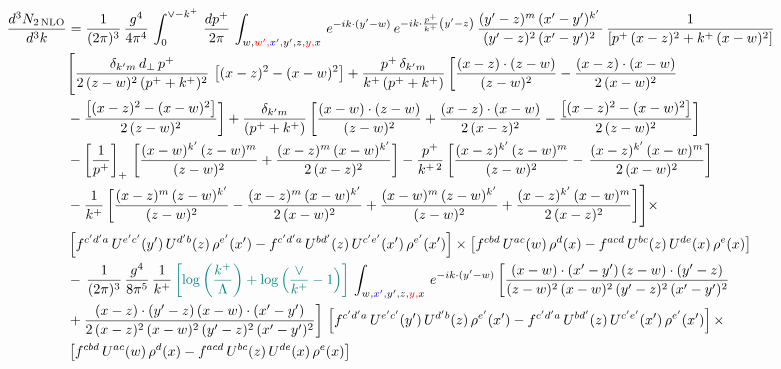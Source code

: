 \documentclass[9pt]{article}
\numberwithin{equation}{section}
\begin{document}
\begin{align}
 \frac{d^{3}N_{2\,\rm NLO}}{d^{3}k} & = \frac{1}{(2\pi)^{3}}\,\frac{g^{4}}{4\pi^{4}}\,\int_{0}^{\vee-k^{+}}\, \frac{dp^{+}}{2\pi}\,\int_{w,{\color{red}w',}{\color{blue}x',}y',z,{\color{red}y,}x}\, e^{-ik\cdot (y'-w)}\,e^{-ik\cdot \frac{p^{+}}{k^{+}}\left(y'-z\right)}\, \frac{(y'-z)^{m}\,(x'-y')^{k'}\,}{(y'-z)^{2}\,(x'-y')^{2}\,}\, \frac{1}{\left[p^{+}\,(x-z)^{2}+k^{+}\,(x-w)^{2}\right]}\notag \\ & \Bigg[\frac{\delta_{k'm}\,d_{\perp}\,p^{+}}{2\,(z-w)^{2}\,(p^{+}+k^{+})^{2}}\, \left[(x-z)^{2}-(x-w)^{2}\right]+\frac{p^{+}\,\delta_{k'm}}{k^{+}\,(p^{+}+k^{+})}\,\bigg[\frac{(x-z)\cdot (z-w)}{(z-w)^{2}} -\frac{(x-z)\cdot (x-w)}{2\,(x-w)^{2}}\notag \\ & -\frac{\left[(x-z)^{2}-(x-w)^{2}\right]}{2\,(z-w)^{2}}\bigg] +\frac{\delta_{k'm}}{(p^{+}+k^{+})}\,\bigg[\frac{(x-w)\cdot (z-w)}{(z-w)^{2}}+\frac{(x-z)\cdot (x-w)}{2\,(x-z)^{2}} -\frac{\left[(x-z)^{2}-(x-w)^{2}\right]}{2\,(z-w)^{2}}\bigg]\notag \\ & -\left[\frac{1}{p^{+}}\right]_{+}\,\bigg[\frac{(x-w)^{k'}\,(z-w)^{m}}{(z-w)^{2}}+\frac{(x-z)^{m}\,(x-w)^{k'}}{2\,(x-z)^{2}}\bigg]-\frac{p^{+}}{k^{+\,2}}\,\bigg[\frac{(x-z)^{k'}\,(z-w)^{m}}{(z-w)^{2}} -\,\frac{(x-z)^{k'}\,(x-w)^{m}}{2\,(x-w)^{2}}\bigg]\notag \\ & -\frac{1}{k^{+}}\,\bigg[\frac{(x-z)^{m}\,(z-w)^{k'}}{(z-w)^{2}}-\frac{(x-z)^{m}\,(x-w)^{k'}}{2\,(x-w)^{2}}+\frac{(x-w)^{m}\,(z-w)^{k'}}{(z-w)^{2}} +\frac{(x-z)^{k'}\,(x-w)^{m}}{2\,(x-z)^{2}}\bigg]\Bigg]\times\,\notag \\ & \left[f^{c'd'a}\,U^{e'c'}(y')\,U^{d'b}(z)\,\rho^{e'}(x')-f^{c'd'a}\, 
    U^{bd'}(z)\,U^{c'e'}(x')\,\rho^{e'}(x')\right]\times \left[f^{cbd}\,U^{ac}(w)\,\rho^{d}(x) -f^{acd}\,U^{bc}(z)\,U^{de}(x)\,\rho^{e}(x)\right]\notag \\ &  -\, \frac{1}{(2\pi)^{3}}\,\frac{g^{4}}{8\pi^{5}}\,\frac{1}{k^{+}}\,{\color{teal}\left[\log{\left(\frac{k^{+}}{\Lambda}\right)}+\log{\left(\frac{\vee}{k^{+}}-1\right)}\right]}\,\int_{w,{\color{blue}x',}y',z,{\color{red}y,}x}\, e^{-ik\cdot (y'-w)}\,\bigg[\frac{(x-w)\cdot (x'-y')\,(z-w)\cdot (y'-z)}{(z-w)^{2}\,(x-w)^{2}\,(y'-z)^{2}\,(x'-y')^{2}}\notag \\ & +\frac{(x-z)\cdot (y'-z)\,(x-w)\cdot (x'-y')}{2\,(x-z)^{2}\,(x-w)^{2}\,(y'-z)^{2}\,(x'-y')^{2}}\bigg]\, \left[f^{c'd'a}\,U^{e'c'}(y')\,U^{d'b}(z)\,\rho^{e'}(x')-f^{c'd'a}\, 
    U^{bd'}(z)\,U^{c'e'}(x')\,\rho^{e'}(x')\right]\times\notag \\ &  \left[f^{cbd}\,U^{ac}(w)\,\rho^{d}(x) -f^{acd}\,U^{bc}(z)\,U^{de}(x)\,\rho^{e}(x)\right] 
\end{align}
\end{document}
